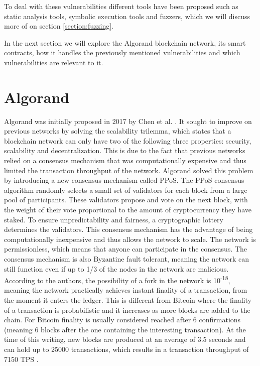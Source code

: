 To deal with these vulnerabilities different tools have been proposed such as static analysis tools, symbolic execution tools and fuzzers, which we will discuss more of on section \ref{section:fuzzing}.

In the next section we will explore the Algorand blockchain network, its smart contracts, how it handles the previously mentioned vulnerabilities and which vulnerabilities are relevant to it.

\section{Algorand} \label{section:algorand}
Algorand was initially proposed in 2017 by Chen et al. \cite{chen_algorand_2017}. It sought to improve on previous networks by solving the scalability trilemma, which states that a blockchain network can only have two of the following three properties: security, scalability and decentralization. This is due to the fact that previous networks relied on a consensus mechanism that was computationally expensive and thus limited the transaction throughput of the network. Algorand solved this problem by introducing a new consensus mechanism called \ac{PPoS}.
The \ac{PPoS} consensus algorithm randomly selects a small set of validators for each block from a large pool of participants.
These validators propose and vote on the next block, with the weight of their vote proportional to the amount of cryptocurrency they have staked.
To ensure unpredictability and fairness, a cryptographic lottery determines the validators.
This consensus mechanism has the advantage of being computationally inexpensive and thus allows the network to scale. The network is permissionless, which means that anyone can participate in the consensus. The consensus mechanism is also Byzantine fault tolerant, meaning the network can still function even if up to 1/3 of the nodes in the network are malicious. According to the authors, the possibility of a fork in the network is 10\textsuperscript{-18}, meaning the network practically achieves instant finality of a transaction, from the moment it enters the ledger. This is different from Bitcoin where the finality of a transaction is probabilistic and it increases as more blocks are added to the chain. For Bitcoin finality is usually considered reached after 6 confirmations (meaning 6 blocks after the one containing the interesting transaction). At the time of this writing, new blocks are produced at an average of 3.5 seconds and can hold up to 25000 transactions, which results in a transaction throughput of 7150 \ac{TPS} \cite{noauthor_algorand_nodate-3}.

